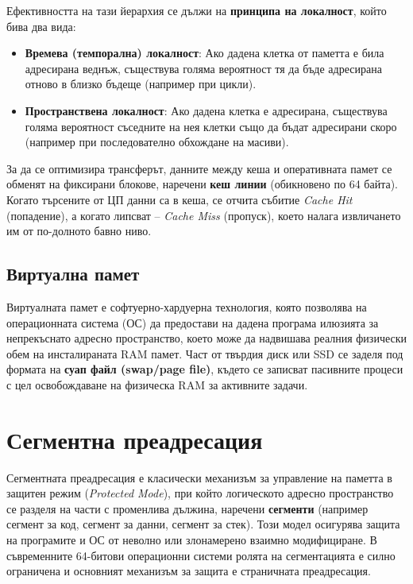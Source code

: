 \documentclass{scrartcl}
\begin{document}
\begin{FlushLeft}
Ефективността на тази йерархия се дължи на \textbf{принципа на локалност}, който бива два вида:
\begin{itemize}
    \item \textbf{Времева (темпорална) локалност}: Ако дадена клетка от паметта е била адресирана веднъж, съществува голяма вероятност тя да бъде адресирана отново в близко бъдеще (например при цикли).
    \item \textbf{Пространствена локалност}: Ако дадена клетка е адресирана, съществува голяма вероятност съседните на нея клетки също да бъдат адресирани скоро (например при последователно обхождане на масиви).
\end{itemize}

За да се оптимизира трансферът, данните между кеша и оперативната памет се обменят на фиксирани блокове, наречени \textbf{кеш линии} (обикновено по 64 байта). Когато търсените от ЦП данни са в кеша, се отчита събитие \textit{Cache Hit} (попадение), а когато липсват – \textit{Cache Miss} (пропуск), което налага извличането им от по-долното бавно ниво.

\subsection{Виртуална памет}
Виртуалната памет е софтуерно-хардуерна технология, която позволява на операционната система (ОС) да предостави на дадена програма илюзията за непрекъснато адресно пространство, което може да надвишава реалния физически обем на инсталираната RAM памет. Част от твърдия диск или SSD се заделя под формата на \textbf{суап файл (swap/page file)}, където се записват пасивните процеси с цел освобождаване на физическа RAM за активните задачи.

\section{Сегментна преадресация}

Сегментната преадресация е класически механизъм за управление на паметта в защитен режим (\textit{Protected Mode}), при който логическото адресно пространство се разделя на части с променлива дължина, наречени \textbf{сегменти} (например сегмент за код, сегмент за данни, сегмент за стек). Този модел осигурява защита на програмите и ОС от неволно или злонамерено взаимно модифициране. В съвременните 64-битови операционни системи ролята на сегментацията е силно ограничена и основният механизъм за защита е страничната преадресация.


\end{FlushLeft}
\end{document}
